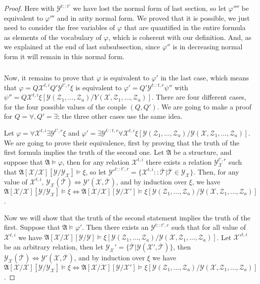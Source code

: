 \documentclass[a4paper,12pt]{article}
\theoremstyle{definition}
\renewcommand{\phi}{\varphi}
\newcommand{\mc}{\mathcal}
\newcommand{\mf}{\mathfrak}
\newcommand{\olmc}[1]{\overline{\mathcal{#1}}}
\begin{document}
\begin{proof}
  Here with $\mc Y^{t::t'}$ we have lost the normal form of last
  section, so let $\phi''''$ be equivalent to $\phi'''$ and in arity
  normal form. We proved that it is possible, we just need to consider
  the free variables of $\phi$ that are quantified in the entire
  formula as elements of the vocabulary of $\phi$, which is coherent
  with our definition. And, as we explained at the end of last
  subsubsection, since $\phi''$ is in decreasing normal form it will
  remain in this normal form.

  \subparagraph{} Now, it remains to prove that $\phi$ is equivalent
  to $\phi'$ in the last case, which means that $\phi=Q \mc
  X^{t,i}Q'\mc Y^{t',r}\xi$ is equivalent to $\phi'=Q'\mc
  Y^{t::t,r}\psi''$ with $\psi''=Q\mc{X}^{t,i}\xi[\mc Y(\mc
  Z_1,\dots,\mc Z_a)/Y(\mc X,\mc Z_1,\dots,\mc Z_a)]$. There are four
  different cases, for the four possible values of the couple
  $(Q,Q')$. We are going to make a proof for $Q=\forall, Q'=\exists$;
  the three other cases use the same idea.

  Let $\phi=\forall \mc X^{t,i}\exists\mc Y^{t',r}\xi$ and
  $\phi'=\exists\mc Y^{t::t,r}\forall\mc{X}^{t,i}\xi[\mc Y(\mc
  Z_1,\dots,\mc Z_a)/\mc Y(\mc X,\mc Z_1,\dots,\mc Z_a)]$. We are
  going to prove their equivalence, first by proving that the truth of
  the first formula implies the truth of the second one.  Let $\mf A$
  be a structure, and suppose that $\mf A\models\phi$, then for any
  relation $\mc X^{t,i}$ there exists a relation $\mc Y_{\mc
    X}^{t',r}$ such that $\mf A[\mc{X/X}][\mc{Y/Y_{X}}]\models\xi$, so
  let $\mc Y'^{t::t',r}=\{\mc X^{t,i}::\olmc T|\olmc
  T\in\mc{Y_{X}}\}$. Then, for any value of  $\mc X^{t,i}$, $\mc
  Y_{\mc X}(\olmc T)\Leftrightarrow \mc Y'(\mc X,\olmc T)$, and by
  induction over $\xi$, we have $\mf
  A[\mc{X/X}][\mc{Y/Y_{X}}]\models\xi\Leftrightarrow\mf
  A[\mc{X/X}][\mc{Y/X'}]\models\xi[\mc Y(\mc Z_1,\dots,\mc Z_a)/\mc
  Y(\mc X,\mc Z_1,\dots,\mc Z_a)]$.

  Now we will show that the truth of the second statement implies the
  truth of the first. Suppose that $\mf A\models\phi'$. Then there
  exists an $\mc Y^{t::t',r}$ such that for all value of $\mc X^{t,i}$
  we have $\mf A[\mc {X/X}][\mc {Y/Y}]\models\xi[\mc Y(\mc
  Z_1,\dots,\mc Z_a)/\mc Y(\mc X,\mc Z_1,\dots,\mc Z_a)]$. Let $\mc
  X'^{t,i}$ be an arbitrary relation, then let $\mc Y_{\mc X}'=\{\olmc
  T|\mc Y(\mc X',\olmc T)\}$, then $\mc Y_{\mc X}(\olmc
  T)\Leftrightarrow \mc Y'(\mc X,\olmc T)$, and by induction over
  $\xi$ we have $\mf
  A[\mc{X/X}][\mc{Y/Y_{X}}]\models\xi\Leftrightarrow\mf
  A[\mc{X/X}][\mc{Y/X'}]\models\xi[\mc Y(\mc Z_1,\dots,\mc Z_a)/\mc
  Y(\mc X,\mc Z_1,\dots,\mc Z_a)]$.

\end{proof}
\end{document}

